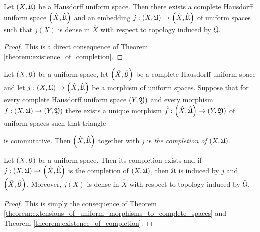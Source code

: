 \begin{corollary}\label{corollary:completion_of_a_Hausdorff_uniform_space}
Let $\left(X,{\mathfrak U}\right)$ be a Hausdorff uniform space. Then there exists a complete Hausdorff uniform space $\left(\hat{X},\hat{{\mathfrak U}}\right)$ and an embedding $j:\left(X,{\mathfrak U}\right)\rightarrow \left(\hat{X},\hat{{\mathfrak U}}\right)$ of uniform spaces such that $j(X)$ is dense in $\hat{X}$ with respect to topology induced by $\hat{{\mathfrak U}}$.
\end{corollary}
\begin{proof}
This is a direct consequence of Theorem \ref{theorem:existence_of_completion}.
\end{proof}

\begin{definition}
Let $(X,{\mathfrak U})$ be a uniform space, let $\left(\hat{X},\hat{{\mathfrak U}}\right)$ be a complete Hausdorff uniform space and let $j:\left(X,{\mathfrak U}\right) \rightarrow \left(\hat{X},\hat{{\mathfrak U}}\right)$ be a morphism of uniform spaces. Suppose that for every complete Hausdorff uniform space $\left(Y,{\mathfrak Y}\right)$ and every morphism $f:\left(X,{\mathfrak U}\right) \rightarrow \left(Y,{\mathfrak Y}\right)$ there exists a unique morphism $\hat{f}:\left(\hat{X},\hat{{\mathfrak U}}\right) \rightarrow \left(Y,{\mathfrak Y}\right)$ of uniform spaces such that triangle 
\begin{center}
\end{center}
is commutative. Then $\left(\hat{X},\hat{{\mathfrak U}}\right)$ together with $j$ is \textit{the completion of $\left(X,{\mathfrak U}\right)$}.
\end{definition}

\begin{corollary}\label{corollary:universal_property_of_completion}
Let $\left(X,{\mathfrak U}\right)$ be a uniform space. Then its completion exists and if $j:\left(X,{\mathfrak U}\right)\rightarrow \left(\hat{X},\hat{{\mathfrak U}}\right)$ is the completion of $\left(X,{\mathfrak U}\right)$, then ${\mathfrak U}$ is induced by $j$ and $\left(\hat{X},\hat{{\mathfrak U}}\right)$. Moreover, $j(X)$ is dense in $\hat{X}$ with respect to topology induced by $\hat{{\mathfrak U}}$.
\end{corollary}
\begin{proof}
This is simply the consequence of Theorem \ref{theorem:extensions_of_uniform_morphisms_to_complete_spaces} and Theorem \ref{theorem:existence_of_completion}.
\end{proof}

